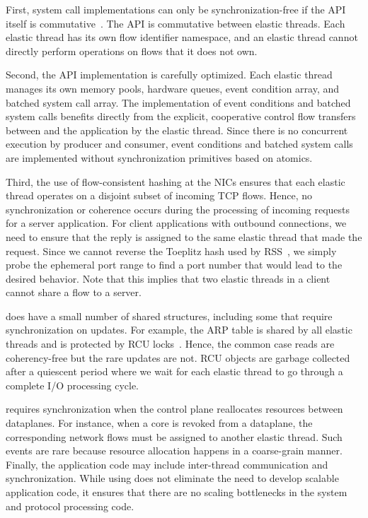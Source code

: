 First, system call implementations can only be synchronization-free if
the API itself is
commutative~\cite{DBLP:conf/sosp/ClementsKZMK13}. The \ix API is
commutative between elastic threads. Each elastic thread has its own
flow identifier namespace, and an elastic thread cannot directly perform
operations on flows that it does not own.

Second, the API implementation is carefully optimized.  Each elastic
thread manages its own memory pools, hardware queues, event condition
array, and batched system call array. The implementation of event conditions and
batched system calls benefits directly from the explicit, cooperative
control flow transfers between \ix and the application by the elastic
thread.  Since there is no concurrent execution by producer and
consumer, event conditions and batched system calls are implemented
without synchronization primitives based on atomics.

Third, the use of flow-consistent hashing at the NICs ensures that
each elastic thread operates on a disjoint subset of incoming TCP
flows. Hence, no synchronization or coherence occurs during the
processing of incoming requests for a server application. For client
applications with outbound connections, we need to ensure that the
reply is assigned to the same elastic thread that made the
request. Since we cannot reverse the Toeplitz hash used by
RSS~\cite{url:rss}, we simply probe the ephemeral port range to find a
port number that would lead to the desired behavior. Note that this
implies that two elastic threads in a client cannot share a flow to a
server.

\ix does have a small number of shared structures, including some that
require synchronization on updates.  For example, the ARP table is
shared by all elastic threads and is protected by RCU
locks~\cite{mckenney1998read}. Hence, the common case reads are
coherency-free but the rare updates are not.
RCU objects are garbage collected after a quiescent period where
we wait for each elastic thread to go through a complete I/O processing
cycle.
%

\ix requires synchronization when the control plane reallocates
resources between dataplanes.  For instance, when a core is revoked
from a dataplane, the corresponding network flows must be assigned
to another elastic thread. Such events are rare because resource
allocation happens in a coarse-grain manner. Finally, the application
code may include inter-thread communication and synchronization. While
using \ix does not eliminate the need to develop scalable application
code, it ensures that there are no scaling bottlenecks in the system
and protocol processing code.

